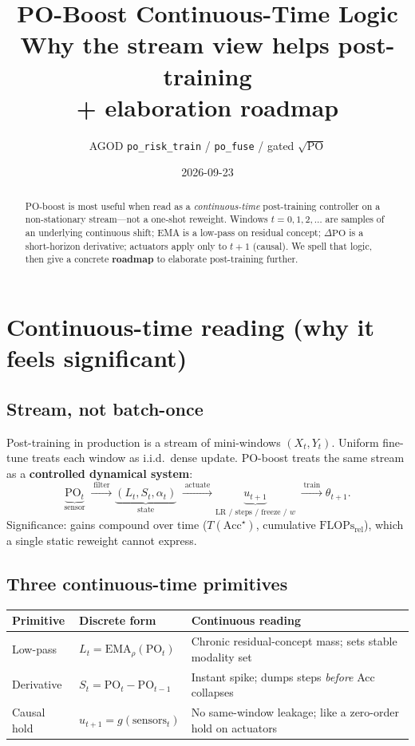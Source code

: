 \documentclass[11pt]{article}
\title{\textbf{PO-Boost Continuous-Time Logic}\\[0.3em]
\large Why the stream view helps post-training\\[0.1em]
\large + elaboration roadmap}
\author{AGOD \quad \texttt{po\_risk\_train} / \texttt{po\_fuse} / gated $\sqrt{\mathrm{PO}}$}
\date{2026-09-23}
\newcommand{\PO}{\mathrm{PO}}
\newcommand{\Flops}{\mathrm{FLOPs}_{\mathrm{rel}}}
\newcommand{\Acc}{\mathrm{Acc}}
\begin{document}
\maketitle

\begin{abstract}
PO-boost is most useful when read as a \emph{continuous-time}
post-training controller on a non-stationary stream---not a one-shot
reweight.
Windows $t=0,1,2,\ldots$ are samples of an underlying continuous
shift; EMA is a low-pass on residual concept; $\Delta\PO$ is a
short-horizon derivative; actuators apply only to $t{+}1$ (causal).
We spell that logic, then give a concrete \textbf{roadmap} to elaborate
post-training further.
\end{abstract}

\section{Continuous-time reading (why it feels significant)}
\label{sec:ct}

\subsection{Stream, not batch-once}
Post-training in production is a stream of mini-windows
$(X_t,Y_t)$.
Uniform fine-tune treats each window as i.i.d.\ dense update.
PO-boost treats the same stream as a \textbf{controlled dynamical
system}:
\[
\underbrace{\PO_t}_{\text{sensor}}
\;\xrightarrow{\;\text{filter}\;}
\underbrace{(L_t,S_t,\alpha_t)}_{\text{state}}
\;\xrightarrow{\;\text{actuate}\;}
\underbrace{u_{t+1}}_{\text{LR / steps / freeze / }w}
\;\xrightarrow{\;\text{train}\;}
\theta_{t+1}.
\]
Significance: gains compound over time ($T(\Acc^\star)$, cumulative
$\Flops$), which a single static reweight cannot express.

\subsection{Three continuous-time primitives}
\begin{center}
\small
\begin{tabular}{@{}llp{5.2cm}@{}}
\toprule
Primitive & Discrete form & Continuous reading \\
\midrule
Low-pass
  & $L_t=\mathrm{EMA}_\rho(\PO_t)$
  & Chronic residual-concept mass; sets stable modality set \\
Derivative
  & $S_t=\PO_t-\PO_{t-1}$
  & Instant spike; dumps steps \emph{before} Acc collapses \\
Causal hold
  & $u_{t+1}=g(\mathrm{sensors}_t)$
  & No same-window leakage; like a zero-order hold on actuators \\
\bottomrule
\end{tabular}
\end{center}
\end{document}
